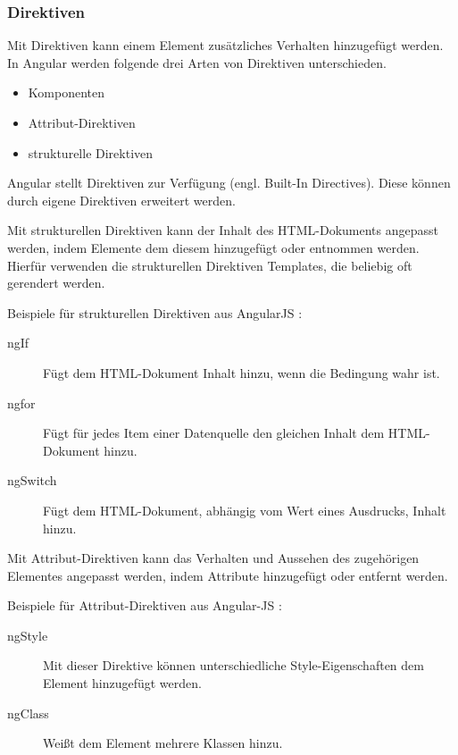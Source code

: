 \subsubsection{Direktiven}


Mit Direktiven kann einem Element zusätzliches Verhalten hinzugefügt werden. \autocite[vgl.][265]{Steyer.2017} In Angular werden folgende drei Arten von Direktiven unterschieden. \autocite[vgl.]{Google.}

\begin{itemize}
	\item Komponenten
	\item Attribut-Direktiven
	\item strukturelle Direktiven 
\end{itemize}

Angular stellt Direktiven zur Verfügung (engl. Built-In Directives). Diese können durch eigene Direktiven erweitert werden. \autocite[vgl.][261]{Freeman.2018}

Mit strukturellen Direktiven kann der Inhalt des HTML-Dokuments angepasst werden, indem Elemente dem diesem hinzugefügt oder entnommen werden. Hierfür verwenden die strukturellen Direktiven Templates, die beliebig oft gerendert werden. \autocites[vgl.][269\psqq]{Steyer.2017}[vgl.][365]{Freeman.2018}

Beispiele für strukturellen Direktiven aus AngularJS \autocite[vgl.][261\psqq]{Freeman.2018}:
\begin{description}
	\item [ngIf] Fügt dem HTML-Dokument Inhalt hinzu, wenn die Bedingung wahr ist. 
	\item [ngfor] Fügt für jedes Item einer Datenquelle den gleichen Inhalt dem HTML-Dokument hinzu.
	\item [ngSwitch] Fügt dem HTML-Dokument, abhängig vom Wert eines Ausdrucks, Inhalt hinzu.
\end{description} 

Mit Attribut-Direktiven kann das Verhalten und Aussehen des zugehörigen Elementes angepasst werden, indem Attribute hinzugefügt oder entfernt werden. \autocite[vgl.][339]{Freeman.2018} 

Beispiele für Attribut-Direktiven aus Angular-JS \autocite[vgl.][249\psqq]{Freeman.2018}:
\begin{description}
	\item [ngStyle] Mit dieser Direktive können unterschiedliche Style-Eigenschaften dem Element hinzugefügt werden.
	\item [ngClass] Weißt dem Element mehrere Klassen hinzu. 
\end{description}

